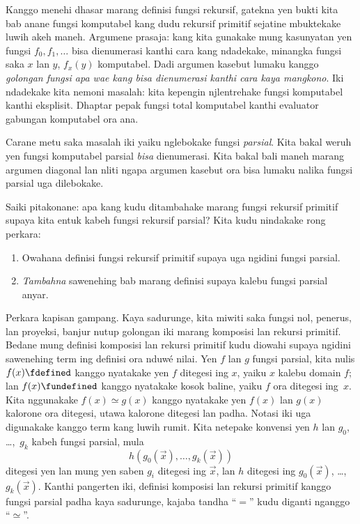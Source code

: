 \documentclass[../../../include/open-logic-section]{subfiles}
\begin{document}


Kanggo menehi dhasar marang definisi fungsi rekursif,
gatekna yen bukti kita bab anane fungsi komputabel
kang dudu rekursif primitif sejatine mbuktekake luwih
akeh maneh. Argumene prasaja: kang kita gunakake
mung kasunyatan yen fungsi $f_0,f_1,\dots$ bisa
dienumerasi kanthi cara kang ndadekake, minangka
fungsi saka $x$ lan $y$, $f_x(y)$ komputabel.
Dadi argumen kasebut lumaku kanggo \emph{golongan
fungsi apa wae kang bisa dienumerasi kanthi cara
kaya mangkono}. Iki ndadekake kita nemoni masalah:
kita kepengin njlentrehake fungsi komputabel kanthi
eksplisit. Dhaptar pepak fungsi total komputabel kanthi evaluator gabungan komputabel ora ana.

Carane metu saka masalah iki yaiku nglebokake
fungsi \emph{parsial}. Kita bakal weruh yen fungsi
komputabel parsial \emph{bisa} dienumerasi.
Kita bakal bali maneh marang argumen diagonal
lan nliti ngapa argumen kasebut ora bisa lumaku
nalika fungsi parsial uga dilebokake.

Saiki pitakonane: apa kang kudu ditambahake
marang fungsi rekursif primitif supaya kita
entuk kabeh fungsi rekursif parsial? Kita
kudu nindakake rong perkara:
\begin{enumerate}
\item Owahana definisi fungsi rekursif primitif
  supaya uga ngidini fungsi parsial.
\item \emph{Tambahna} sawenehing bab marang definisi
  supaya kalebu fungsi parsial anyar.
\end{enumerate}

Perkara kapisan gampang. Kaya sadurunge,
kita miwiti saka fungsi nol, penerus, lan
proyeksi, banjur nutup golongan iki marang
komposisi lan rekursi primitif. Bedane mung
definisi komposisi lan rekursi primitif kudu
diowahi supaya ngidini sawenehing term ing
definisi ora nduwé nilai. Yen $f$ lan $g$
fungsi parsial, kita nulis $f(x) \fdefined$
kanggo nyatakake yen $f$ ditegesi ing $x$,
yaiku $x$ kalebu domain $f$; lan
$f(x) \fundefined$ kanggo nyatakake kosok
baline, yaiku $f$ ora ditegesi ing~$x$.
Kita nggunakake $f(x) \simeq g(x)$ kanggo
nyatakake yen $f(x)$ lan $g(x)$ kalorone
ora ditegesi, utawa kalorone ditegesi lan
padha. Notasi iki uga digunakake kanggo
term kang luwih rumit. Kita netepake
konvensi yen $h$ lan $g_0$, \dots,~$g_k$
kabeh fungsi parsial, mula
\[
h(g_0(\vec x),\dots,g_k(\vec x))
\]
ditegesi yen lan mung yen saben $g_i$ ditegesi
ing $\vec x$, lan $h$ ditegesi ing
$g_0(\vec x)$, \dots,~$g_k(\vec x)$.
Kanthi pangerten iki, definisi komposisi
lan rekursi primitif kanggo fungsi parsial
padha kaya sadurunge, kajaba tandha
``$=$'' kudu diganti nganggo ``$\simeq$''.
\end{document}
